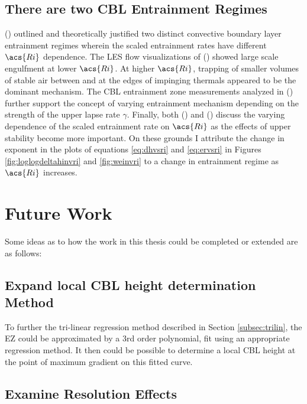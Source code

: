 \subsection{There are two \acs{CBL} Entrainment Regimes}

\citeauthor{Turner86} (\citeyear{Turner86}) outlined and theoretically justified two distinct convective boundary layer entrainment regimes wherein the scaled entrainment rates have different $\acs{Ri}$ dependence. The \acs{LES} flow visualizations of \citeauthor{SullMoengStev} (\citeyear{SullMoengStev}) showed large scale engulfment at lower $\acs{Ri}$.  At higher $\acs{Ri}$, trapping of smaller volumes of stable air between and at the edges of impinging thermals appeared to be the dominant mechanism. The \acs{CBL} entrainment zone measurements analyzed in \citeauthor{Traum11} (\citeyear{Traum11}) further support the concept of varying entrainment mechanism depending on the strength of the upper lapse rate $\gamma$.  Finally, both \citeauthor{FedConzMir04} (\citeyear{FedConzMir04})  and \citeauthor{GarciaMellado} (\citeyear{GarciaMellado}) discuss the varying dependence of the scaled entrainment rate on $\acs{Ri}$ as the effects of upper stability become more important.  On these grounds I attribute the change in exponent in the plots of equations \ref{eq:dhvsri} and \ref{eq:ervsri} in Figures \ref{fig:loglogdeltahinvri} and \ref{fig:weinvri} to a change in entrainment regime as $\acs{Ri}$ increases.   


\section{Future Work}

Some ideas as to how the work in this thesis could be completed or extended are as follows:

\subsection{Expand local \acs{CBL} height determination Method}

To further the tri-linear regression method described in Section \ref{subsec:trilin}, the \acs{EZ} could be approximated by a 3rd order polynomial, fit using an appropriate regression method.  It then could be possible to determine a local \acs{CBL} height at the point of maximum gradient on this fitted curve.\\

\subsection{Examine Resolution Effects}

